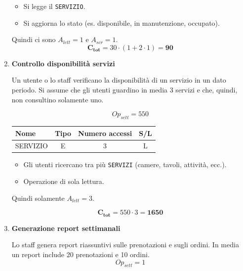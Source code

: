 \documentclass[a4paper,12pt]{report}
\begin{document}
\begin{enumerate}
	      \begin{itemize}
		      \item Si legge il \texttt{SERVIZIO}.
		      \item Si aggiorna lo stato (es. disponibile, in manutenzione, occupato).
	      \end{itemize}

	      Quindi ci sono $A_{lett}=1$ e $A_{scr}=1$.
	      $$\mathbf{C_{tot}} = 30 \cdot (1 + 2 \cdot 1) = \mathbf{90}$$

	\item {\large \textbf{Controllo disponibilità servizi}} \label{op15}

	      Un utente o lo staff verificano la disponibilità di un servizio in un dato periodo.
	      Si assume che gli utenti guardino in media 3 servizi e che, quindi, non consultino solamente uno.

	      $$
		      Op_{sett} = 550
	      $$

	      \begin{table}[H]
		      \centering
		      \small
		      \renewcommand{\arraystretch}{1.15}
		      \begin{tabularx}{0.8\textwidth}{|X|c|c|c|}
			      \hline
			      \rowcolor{gray!20}
			      \textbf{Nome} & \textbf{Tipo} & \textbf{Numero accessi} & \textbf{S/L} \\
			      \hline
			      SERVIZIO      & E             & 3                       & L            \\
			      \hline
		      \end{tabularx}
	      \end{table}

	      \begin{itemize}
		      \item Gli utenti ricercano tra più \texttt{SERVIZI} (camere, tavoli, attività, ecc.).
		      \item Operazione di sola lettura.
	      \end{itemize}

	      Quindi solamente $A_{lett}=3$.

	      $$\mathbf{C_{tot}} = 550 \cdot 3 = \mathbf{1650}$$

	\item {\large \textbf{Generazione report settimanali}} \label{op16}

	      Lo staff genera report riassuntivi sulle prenotazioni e sugli ordini.
	      In media un report include 20 prenotazioni e 10 ordini.
	      $$
		      Op_{sett} = 1
	      $$


\end{enumerate}
\end{document}
